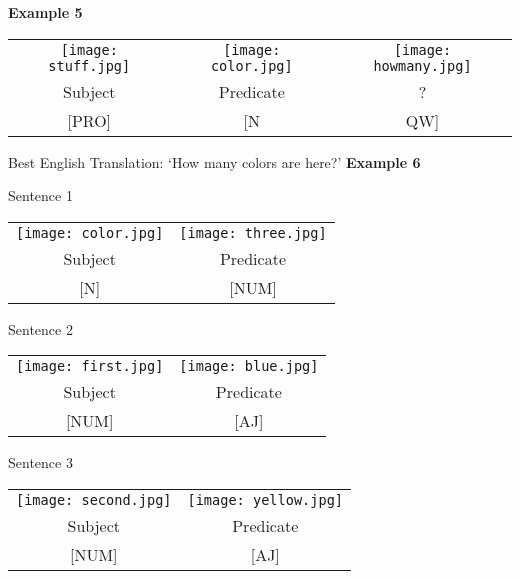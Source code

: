 \documentclass{tufte-book}
\begin{document}
\vspace{0.25cm}\noindent \textbf{Example 5}
\begin{table*}[h!]
\begin{tabular}{c | c c}
\texttt{[image: stuff.jpg]}&\texttt{[image: color.jpg]}&\texttt{[image: howmany.jpg]}\\
\footnotesize Subject & \footnotesize Predicate & \footnotesize ?\\
\footnotesize [PRO] & \footnotesize [N & \footnotesize QW]\\
\end{tabular}
\end{table*}

Best English Translation: `How many colors are here?'
\newpage
\noindent \textbf{Example 6}

\noindent Sentence 1
\begin{table*}[h!]
\begin{tabular}{c c}
\texttt{[image: color.jpg]}&\texttt{[image: three.jpg]}\\
\footnotesize Subject & \footnotesize Predicate \\
\footnotesize [N] & \footnotesize [NUM]\\
\end{tabular}
\end{table*}

\noindent Sentence 2

\begin{table*}[h!]
\begin{tabular}{c c}
\texttt{[image: first.jpg]}&\texttt{[image: blue.jpg]}\\
\footnotesize Subject & \footnotesize Predicate \\
\footnotesize [NUM] & \footnotesize [AJ]\\
\end{tabular}
\end{table*}

\noindent Sentence 3

\begin{table*}[h!]
\begin{tabular}{c c}
\texttt{[image: second.jpg]}&\texttt{[image: yellow.jpg]}\\
\footnotesize Subject & \footnotesize Predicate \\
\footnotesize [NUM] & \footnotesize [AJ]\\
\end{tabular}
\end{table*}
\end{document}
